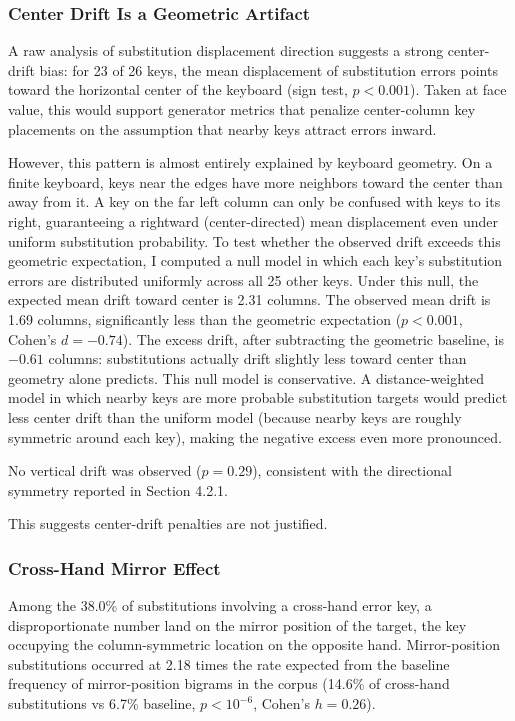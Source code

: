 \documentclass[12pt]{article}
\begin{document}
\subsubsection{Center Drift Is a Geometric Artifact}

A raw analysis of substitution displacement direction suggests a strong center-drift bias: for 23 of 26 keys, the mean displacement of substitution errors points toward the horizontal center of the keyboard (sign test, $p < 0.001$). Taken at face value, this would support generator metrics that penalize center-column key placements on the assumption that nearby keys attract errors inward.

However, this pattern is almost entirely explained by keyboard geometry. On a finite keyboard, keys near the edges have more neighbors toward the center than away from it. A key on the far left column can only be confused with keys to its right, guaranteeing a rightward (center-directed) mean displacement even under uniform substitution probability. To test whether the observed drift exceeds this geometric expectation, I computed a null model in which each key's substitution errors are distributed uniformly across all 25 other keys. Under this null, the expected mean drift toward center is 2.31 columns. The observed mean drift is 1.69 columns, significantly less than the geometric expectation ($p < 0.001$, Cohen's $d = -0.74$). The excess drift, after subtracting the geometric baseline, is $-0.61$ columns: substitutions actually drift slightly less toward center than geometry alone predicts. This null model is conservative. A distance-weighted model in which nearby keys are more probable substitution targets would predict less center drift than the uniform model (because nearby keys are roughly symmetric around each key), making the negative excess even more pronounced.

No vertical drift was observed ($p = 0.29$), consistent with the directional symmetry reported in Section 4.2.1.

This suggests center-drift penalties are not justified.

\subsubsection{Cross-Hand Mirror Effect}

Among the 38.0\% of substitutions involving a cross-hand error key, a disproportionate number land on the mirror position of the target, the key occupying the column-symmetric location on the opposite hand. Mirror-position substitutions occurred at 2.18 times the rate expected from the baseline frequency of mirror-position bigrams in the corpus (14.6\% of cross-hand substitutions vs 6.7\% baseline, $p < 10^{-6}$, Cohen's $h = 0.26$).
\end{document}
